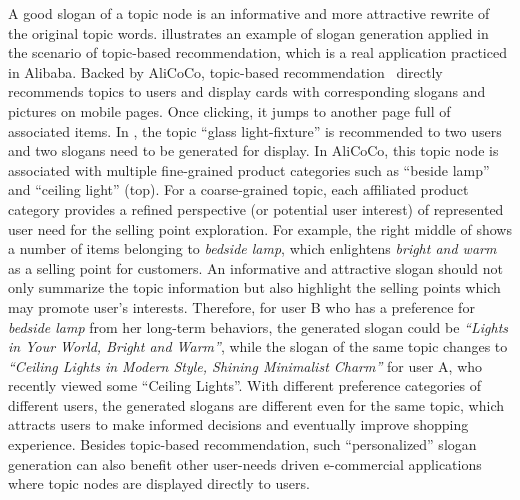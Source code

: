 A good slogan of a topic node is an informative and more attractive rewrite of the original topic words.
 illustrates an example of slogan generation applied in the scenario of topic-based recommendation, 
which is a real application practiced in Alibaba.
Backed by AliCoCo, 
topic-based recommendation~\cite{luo2019conceptualize} 
directly recommends topics to users and display cards with corresponding slogans and pictures on mobile pages. Once clicking, it jumps to another page full of associated items.
In , the topic ``glass light-fixture'' is recommended to two users and two slogans need to be generated for display.
In AliCoCo, this topic node is associated with multiple fine-grained product categories such as ``beside lamp'' and ``ceiling light'' (top).
For a coarse-grained topic, each affiliated product category provides a refined perspective (or potential user interest) of represented user need for the selling point exploration.
For example, the right middle of  shows a number of items belonging to \emph{bedside lamp}, which enlightens \emph{bright and warm} as a selling point for customers.
An informative and attractive slogan should not only summarize the topic information but also highlight the selling points which may promote user's interests.
Therefore, for user B who has a preference for \emph{bedside lamp} from her long-term behaviors, 
the generated slogan could be \emph{``Lights in Your World, Bright and Warm''}, 
while the slogan of the same topic changes to \emph{``Ceiling Lights in Modern Style, Shining Minimalist Charm''} for user A, who recently viewed some ``Ceiling Lights''.
With different preference categories of different users, 
the generated slogans are different even for the same topic,
which attracts users to make informed decisions and eventually improve shopping experience.
Besides topic-based recommendation, 
such ``personalized'' slogan generation can also benefit other user-needs driven e-commercial applications where topic nodes are displayed directly to users.


